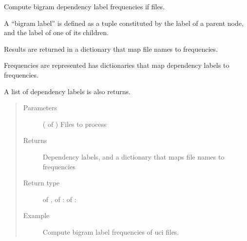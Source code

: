 \documentclass[letterpaper,10pt,english]{sphinxmanual}
\begin{document}
\begin{fulllineitems}
\label{\detokenize{analysis:loacore.analysis.frequencies.bigram_label_frequencies}}
Compute bigram dependency label frequencies if files.

A “bigram label” is defined as a tuple constituted by the label of a parent node, and the label of one of its
children.

Results are returned in a dictionary that map file names to frequencies.

Frequencies are represented has dictionaries that map dependency labels to frequencies.

A list of dependency labels is also returns.
\begin{quote}\begin{description}
\item[{Parameters}] \leavevmode
{} ( of {\hyperref[\detokenize{classes:loacore.classes.classes.File}]{}}) \textendash{} Files to process

\item[{Returns}] \leavevmode
Dependency labels, and a dictionary that maps file names to frequencies

\item[{Return type}] \leavevmode
{} of  ,  of  :  of  : 

\item[{Example}] \leavevmode
Compute bigram label frequencies of uci files.

\end{description}\end{quote}

\end{fulllineitems}

\end{document}
